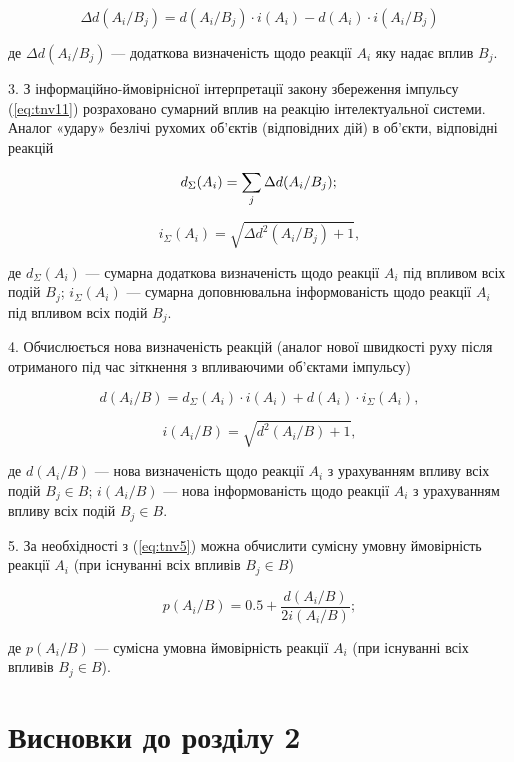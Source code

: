 \[
	\Delta d(A_i/B_j)=d(A_i/B_j)\cdot i(A_i)-d(A_i)\cdot i(A_i/B_j)
\]

\noindent
де $\Delta d(A_i/B_j)$ --- додаткова визначеність щодо реакції $A_i$ яку надає вплив $B_j$.

3. З інформаційно-ймовірнісної інтерпретації закону збереження імпульсу (\ref{eq:tnv11}) розраховано сумарний вплив на реакцію інтелектуальної системи. Аналог «удару» безлічі рухомих об'єктів (відповідних дій) в об'єкти, відповідні реакцій

\[
	d_\Sigma(A_i) = \sum_j \Delta d(A_i/B_j); \\
\]

\[
	i_\Sigma(A_i) = \sqrt{\Delta d^2(A_i/B_j)+1},
\]

\noindent
де $d_\Sigma(A_i)$ --- сумарна додаткова визначеність щодо реакції $A_i$ під впливом всіх подій $B_j$; $i_\Sigma(A_i)$ --- сумарна доповнювальна інформованість щодо реакції $A_i$ під впливом всіх подій $B_j$.

4. Обчислюється нова визначеність реакцій (аналог нової швидкості руху після отриманого під час зіткнення з впливаючими об'єктами імпульсу)

\begin{equation}
\label{eq:ifron2}
d(A_i/B)=d_\Sigma(A_i)\cdot i(A_i)+d(A_i)\cdot i_\Sigma(A_i),
\end{equation}


\[
i(A_i/B) = \sqrt{d^2(A_i/B)+1},
\]

\noindent
де $d(A_i/B)$ --- нова визначеність щодо реакції $A_i$ з урахуванням впливу всіх подій $B_j \in B$; $i(A_i/B)$ --- нова інформованість щодо реакції $A_i$ з урахуванням впливу всіх подій $B_j \in B$.

5. За необхідності з (\ref{eq:tnv5}) можна обчислити сумісну умовну ймовірність реакції $A_i$ (при існуванні всіх впливів $B_j \in B$)

\[
p(A_i/B)=0.5+\frac{d(A_i/B)}{2i(A_i/B)};
\]

\noindent
де $p(A_i/B)$ --- сумісна умовна ймовірність реакції $A_i$ (при існуванні всіх впливів $B_j \in B$).

\section*{Висновки до розділу 2}
